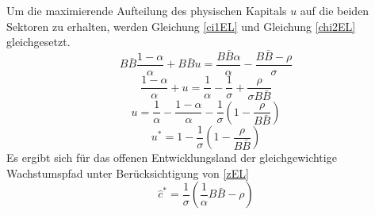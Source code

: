 Um die maximierende Aufteilung des physischen Kapitals $u$ auf die beiden Sektoren zu erhalten, werden Gleichung \eqref{ci1EL} und Gleichung \eqref{chi2EL} gleichgesetzt. 
\begin{equation}
B \bar{B} \frac{1- \alpha}{\alpha} +  B \bar{B} u = \frac{B \bar{B} \alpha}{\alpha} - \frac{B \bar{B} - \rho}{\sigma}
\end{equation}
\begin{equation*}
\frac{1- \alpha}{\alpha} + u = \frac{1}{\alpha} - \frac{1}{\sigma} + \frac{\rho}{ \sigma B \bar{B}}
\end{equation*}
\begin{equation*}
u= \frac{1}{\alpha} - \frac{1- \alpha}{\alpha} - \frac{1}{\sigma}\left(1- \frac{\rho}{B \bar{B}}\right)
\end{equation*}
\begin{equation}
\boxed{u^*= 1- \frac{1}{\sigma}\left(1-  \frac{\rho}{B \bar{B}}\right)}
\end{equation}
Es ergibt sich für das offenen Entwicklungsland der gleichgewichtige Wachstumspfad unter Berücksichtigung von \eqref{zEL}
\begin{equation}
\boxed{\hat{c}^*=\frac{1}{\sigma}\left(\frac{1}{\alpha} B\bar{B}-\rho\right)}
\end{equation}






